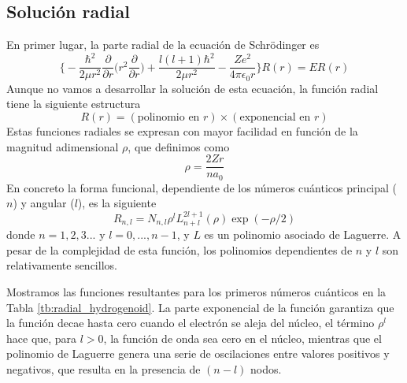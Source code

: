 \subsection{Solución radial}
En primer lugar, la parte radial de la ecuación de Schrödinger es
\begin{equation}
    \bigg\{-\frac{\hbar^2}{2\mu r^2}\frac{\partial}{\partial r}\bigg(r^2\frac{\partial}{\partial r}\bigg) 
    +  \frac{l(l+1)\hbar^2}{2\mu r^2}
    - \frac{Ze^2}{4\pi \epsilon_0r}  \bigg\}
    R(r)
    = ER(r)
\end{equation}
Aunque no vamos a desarrollar la solución de esta ecuación, la función
radial tiene la siguiente estructura
\begin{equation}
    R(r)=(\textrm{polinomio en }r)\times(\textrm{exponencial en }r)
\end{equation}
Estas funciones radiales se expresan con mayor facilidad 
en función de la magnitud adimensional $\rho$, que definimos como
\begin{equation}
    \rho = \frac{2Zr}{na_0}
\end{equation}
En concreto la forma funcional, dependiente de los números
cuánticos principal ($n$) y angular ($l$), es la siguiente
\begin{equation}
  R_{n,l} = N_{n,l}\rho^l L^{2l+1}_{n+l}(\rho)\exp(-\rho/2)
\end{equation}
donde $n=1,2,3...$ y $l=0,...,n-1$, y $L$ es un polinomio
asociado de Laguerre. A pesar de la complejidad de esta función,
los polinomios dependientes de $n$ y $l$ son relativamente
sencillos. 

Mostramos las 
funciones resultantes para los primeros números cuánticos en
la Tabla \ref{tb:radial_hydrogenoid}. La parte exponencial de
la función garantiza que la función decae hasta cero cuando
el electrón se aleja del núcleo, el término $\rho^l$ hace
que, para $l>0$, la función de onda sea cero en el núcleo, 
mientras que el polinomio de Laguerre genera una serie de 
oscilaciones entre valores positivos y negativos, que resulta
en la presencia de $(n-l)$ nodos. 


